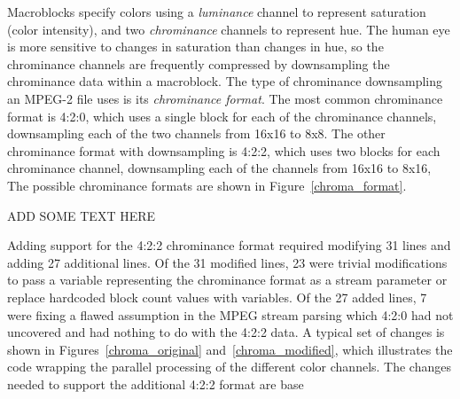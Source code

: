 \SubSection{   }


Macroblocks specify colors using a {\it luminance} channel to
represent saturation (color intensity), and two {\it chrominance}
channels to represent hue. The human eye is more sensitive to changes
in saturation than changes in hue, so the chrominance channels
are frequently compressed by downsampling the chrominance data within
a macroblock. The type of chrominance downsampling an MPEG-2 file
uses is its {\it chrominance format}. The most common chrominance
format is 4:2:0, which uses a single block for each of the chrominance
channels, downsampling each of the two channels from 16x16 to 8x8. 
The other chrominance format with downsampling is 4:2:2, which uses two
blocks for each chrominance channel, downsampling each of the channels
from 16x16 to 8x16, The possible chrominance formats are shown in
Figure~\ref{chroma_format}.

ADD SOME TEXT HERE

Adding support for the 4:2:2 chrominance format required modifying 31 lines
and adding 27 additional lines. Of the 31 modified lines, 23 were trivial
modifications to pass a variable representing the chrominance format
as a stream parameter or replace hardcoded block count values with variables.
Of the 27 added lines, 7 were fixing a flawed assumption in the MPEG stream
parsing which 4:2:0 had not uncovered and had nothing to do with the 4:2:2
data. A typical set of changes is shown in Figures~\ref{chroma_original} and~\ref{chroma_modified}, which
illustrates the code wrapping the parallel processing of the different
color channels. The changes needed to support the additional 4:2:2 format
are base

